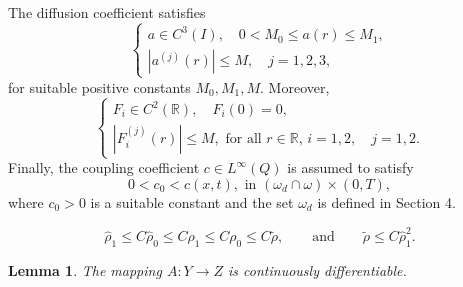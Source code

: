 \documentclass[10pt,a4paper]{amsart}
\newtheorem{lemma}{Lemma}
\begin{document}
The diffusion coefficient satisfies
    \begin{equation} \label{condiciones_a4}
    \begin{cases}
        a\in C^3(I),\quad 0 < M_0 \leq a(r) \leq M_1,\\
        |a^{(j)}(r)|\leq M,\quad j=1,2,3,
    \end{cases}
    \end{equation}
    for suitable positive constants $M_0,M_1,M$. Moreover,
    \begin{equation}
        \begin{cases} \label{condiciones_a4f}
 		 F_i\in C^2(\mathbb{R}), \quad F_i(0)=0,\\
             |{F_{i}^{(j)}(r)}|\leq M, \text{ for all } r \in \mathbb{R}, \, i=1,2,\quad j=1,2.
 	      \end{cases}
    \end{equation}
   Finally, the coupling coefficient $c\in L^\infty(Q)$ is assumed to satisfy
   \begin{equation}\label{condiciones_a4c(x,t)}
    0<c_0<c(x,t), \text{ in } (\omega_d\cap\omega)\times(0,T),
    \end{equation}
    where $c_0>0$ is a suitable constant and  the set $\omega_d$ is defined in Section 4.

\begin{equation}\label{eq:compara_rhos3}
	\hat\rho_1 \leq C\hat\rho_0 \leq  C\rho_{1}\leq C\rho_{0}\leq C\tilde \rho, \qquad %
    \text{and} \qquad \tilde \rho \leq C \hat\rho_1^2.   
\end{equation}

\begin{lemma}\label{lema2}
    The mapping $A : Y \rightarrow Z$ is continuously differentiable.
\end{lemma}
\end{document}
